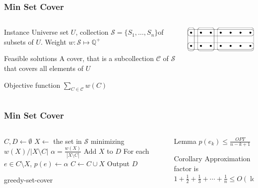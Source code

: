 \documentclass[12pt,aspectratio=169]{beamer}
\begin{document}
\begin{frame}\frametitle{Min Set Cover }
\begin{columns} 
  \begin{column}{0.48\textwidth}
  \begin{block}{Instance}
    Universe set $U$, collection $\mathcal{S} = \{S_{1}, \ldots , S_{n}\}$of subsets of
    $U$.
    Weight $w: \mathcal{S}\mapsto \mathbb{Q}^{+}$
%
  \end{block}
  \begin{block}{Feasible solutions}
    A cover, that is a subcollection $\mathcal{C}$ of $\mathcal{S}$ that covers all elements of $U$
  \end{block}
  \begin{block}{Objective function}
    $\sum_{C\in \mathcal{C}} w(C)$
  \end{block}
\end{column}
    
    \begin{column}{0.48\textwidth}
      \centering

  \includegraphics[height=0.2\textheight]{img/SetCoverGreedy}
\end{column}
\end{columns}
\end{frame}

\begin{frame}\frametitle{Min Set Cover }
\begin{columns} 
  \begin{column}{0.61\textwidth}
\begin{algorithm}[H]
  $C, D\gets \emptyset$\;
{
  $X\gets$ the set in $\mathcal{S}$ minimizing $w(X)/|X\setminus C|$\;
  $\alpha = \frac{w(X)}{|X\setminus C|}$\;
  Add $X$ to $D$\;
  For each $e\in C\setminus X$, $p(e)\gets \alpha$\;
  $C\gets C\cup X$
}
Output $D$
\caption{greedy-set-cover}
\end{algorithm}
\end{column}
  \begin{column}{0.34\textwidth}
\begin{block}{Lemma}
    $p(e_{k}) \le \frac{OPT}{n-k+1}$
  \end{block}
  \begin{block}{Corollary}
    Approximation factor is $1 + \frac{1}{2} + \frac{1}{3} + \cdots + \frac{1}{n} \le
    O(\log n)$
  \end{block}
\end{column}
\end{columns}
\end{frame}
\end{document}
